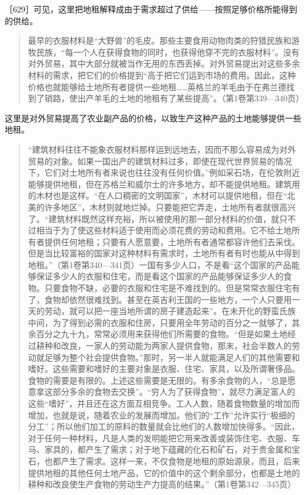 ［629］可见，这里把地租解释成由于需求超过了供给——按照足够价格所能得到的供给。

\begin{quote}{最早的衣服材料是“大野兽”的毛皮。那些主要食用动物肉类的狩猎民族和游牧民族，“每一个人在获得食物的同时，也获得他穿不完的衣服材料”。没有对外贸易，其中大部分就被当作无用的东西丢掉。对外贸易提出对这些多余材料的需求，把它们的价格提到“高于把它们运到市场的费用。因此，这种价格也就能够给土地所有者提供一些地租……英格兰的羊毛由于在弗兰德找到了销路，使出产羊毛的土地的地租有了某些提高”。（第1卷第339—340页）}\end{quote}

这里是对外贸易提高了农业副产品的价格，以致生产这种产品的土地能够提供一些地租。

\begin{quote}{“建筑材料往往不能象衣服材料那样运到远地去，因而不那么容易成为对外贸易的对象。如果一国出产的建筑材料过多，即使在现代世界贸易的情况下，它们对土地所有者来说也往往没有任何价值。”例如采石场，在伦敦附近能够提供地租，但在苏格兰和威尔士的许多地方，却不能提供地租。建筑用的木材也是这样。“在人口稠密的文明国家”，木材可以提供地租，但在“北美的许多地区”，木材则就地烂掉。只要能把它弄走，土地所有者就很高兴了。“建筑材料既然这样充裕，所以被使用的那一部分材料的价值，就只不过相当于为了使这些材料适于使用而必须花费的劳动和费用。它不给土地所有者提供任何地租；只要有人愿意要，土地所有者通常都容许他们去采伐。但是当比较富裕的国家对这种材料有需求时，土地所有者有时也能从中得到地租。”（第1卷第340—341页）一国有多少人口，不是看“这个国家的产品能够保证多少人的衣服和住宅，而是看这个国家的产品能够保证多少人的食物。只要食物不缺，必要的衣服和住宅是不难找到的。但是常常衣服住宅有了，食物却依然很难找到。甚至在英吉利王国的一些地方，一个人只要用一天的劳动，就可以把一座当地所谓的房子建造起来”。在未开化的野蛮氏族中间，为了得到必需的衣服和住房，只要用全年劳动的百分之一就够了，其余百分之九十九，常常必须用来获得他们所需要的食物。“但是如果土地经过耕种和改良，一家人的劳动能为两家人提供食物，那末，社会半数人的劳动就足够为整个社会提供食物。”那时，另一半人就能满足人们的其他需要和嗜好。这些需要和嗜好的主要对象是衣服、住宅、家具，以及所谓奢侈品。食物的需要是有限的。上述这些需要是无限的。有多余食物的人，“总是愿意拿这部分多余的食物去交换”。“穷人为了获得食物”，就尽力满足富人的这些“嗜好”，并且还在这方面互相竞争。工人人数，随着食物数量的增加而增加，也就是说，随着农业的发展而增加。他们的“工作”允许实行“极细的分工”；所以他们加工的原料的数量就会比他们的人数增加快得多。“因此，对于任何一种材料，凡是人类的发明能把它用来改善或装饰住宅、衣服、车马、家具的，都产生了需求；对于地下蕴藏的化石和矿石，对于贵金属和宝石，也都产生了需求。这样一来，不仅食物是地租的原始源泉，而且，后来提供地租的其他任何土地产品，它的价值中的这个剩余部分，也都是土地的耕种和改良使生产食物的劳动生产力提高的结果。”（第1卷第342—345页）}\end{quote}

